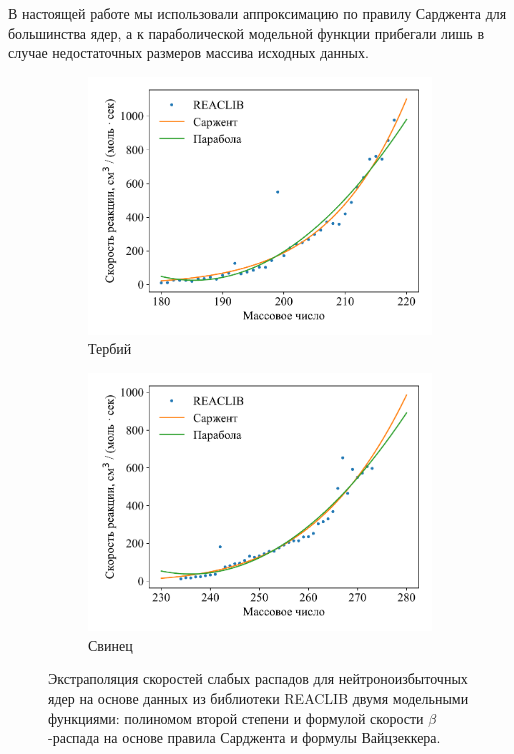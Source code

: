   В настоящей работе мы использовали аппроксимацию по правилу Сарджента для большинства ядер, а к параболической модельной функции прибегали лишь в случае недостаточных размеров массива исходных данных.
  
\begin{figure}
  \centering
  \begin{subfigure}{0.48\textwidth}
    \centering
    \includegraphics[width=\textwidth]{pics/decay_fit65.pdf}
    \caption{Тербий}
  \end{subfigure}
  \hfill
  \begin{subfigure}{0.48\textwidth}
    \centering
    \includegraphics[width=\textwidth]{pics/decay_fit82.pdf}
    \caption{Свинец}
  \end{subfigure}
  \caption{Экстраполяция скоростей слабых распадов для нейтроноизбыточных ядер на основе данных из библиотеки REACLIB двумя модельными функциями: полиномом второй степени и формулой скорости $\beta$-распада на основе правила Сарджента и формулы Вайцзеккера.}
  \label{fig:decay_fit}
\end{figure}

